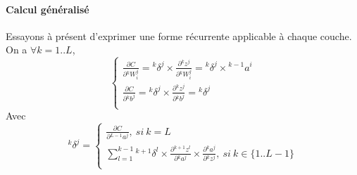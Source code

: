 \documentclass[a4paper, 11pt]{report}
\newcommand{\lexp}[1]{\phantom{}^{#1}}
\newcommand{\elem}[4]{\lexp{#2}#1^{#3}_{#4}}
\begin{document}
\paragraph{Calcul généralisé}
Essayons à présent d'exprimer une forme récurrente applicable à chaque couche.
On a $\forall k = 1..L$,
$$\left\{
\begin{array}{l}
	\frac{\partial C}{\partial \elem{W}{k}{j}{i}} = \elem{\delta}{k}{j}{} \times \frac{\partial \elem{z}{k}{j}{}}{\partial \elem{W}{k}{j}{i}} = \elem{\delta}{k}{j}{} \times \elem{a}{k-1}{i}{} 
	\\                                                                                                                                                                                        
	\frac{\partial C}{\partial \elem{b}{k}{j}{}} = \elem{\delta}{k}{j}{} \times \frac{\partial \elem{z}{k}{j}{}}{\partial \elem{b}{k}{j}{}} = \elem{\delta}{k}{j}{}                             
	\\                                                                                                                                                                                        
\end{array}
\right.$$
Avec $$\elem{\delta}{k}{j}{} = \left\{
\begin{array}{l}
	\frac{\partial C}{\partial \elem{a}{L-1}{j}{}}, \  si \ k=L                                                                                                                                                  
	\\                                                                                                                                                                                                         
	\sum_{l=1}^{k-1}{\elem{\delta}{k+1}{l}{} \times \frac{\partial \elem{z}{k+1}{l}{}}{\partial \elem{a}{k}{j}{}} \times \frac{\partial \elem{a}{k}{j}{}}{\partial \elem{z}{k}{j}{}}}, \ si \ k \in \{1 .. L-1\}
	\\
\end{array}
\right.$$
				
\end{document}
